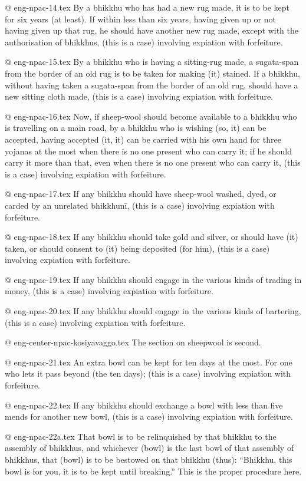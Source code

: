 @ eng-npac-14.tex
By a bhikkhu who has had a new rug made, it is to be kept for six years (at least). If within less than six years, having given up or not having given up that rug, he should have another new rug made, except with the authorisation of bhikkhus, (this is a case) involving expiation with forfeiture.

@ eng-npac-15.tex
By a bhikkhu who is having a sitting-rug made, a sugata-span from the border of an old rug is to be taken for making (it) stained. If a bhikkhu, without having taken a sugata-span from the border of an old rug, should have a new sitting cloth made, (this is a case) involving expiation with forfeiture.

@ eng-npac-16.tex
Now, if sheep-wool should become available to a bhikkhu who is travelling on a main road, by a bhikkhu who is wishing (so, it) can be accepted, having accepted (it, it) can be carried with his own hand for three yojanas at the most when there is no one present who can carry it; if he should carry it more than that, even when there is no one present who can carry it, (this is a case) involving expiation with forfeiture.

@ eng-npac-17.tex
If any bhikkhu should have sheep-wool washed, dyed, or carded by an unrelated bhikkhunī, (this is a case) involving expiation with forfeiture.

@ eng-npac-18.tex
If any bhikkhu should take gold and silver, or should have (it) taken, or should consent to (it) being deposited (for him), (this is a case) involving expiation with forfeiture.

@ eng-npac-19.tex
If any bhikkhu should engage in the various kinds of trading in money, (this is a case) involving expiation with forfeiture.

@ eng-npac-20.tex
If any bhikkhu should engage in the various kinds of bartering, (this is a case) involving expiation with forfeiture.

@ eng-center-npac-kosiyavaggo.tex
The section on sheepwool is second.

@ eng-npac-21.tex
An extra bowl can be kept for ten days at the most. For one who lets it pass beyond (the ten days); (this is a case) involving expiation with forfeiture.

@ eng-npac-22.tex
If any bhikkhu should exchange a bowl with less than five mends for another new bowl, (this is a case) involving expiation with forfeiture. 

@ eng-npac-22a.tex
That bowl is to be relinquished by that bhikkhu to the assembly of bhikkhus, and whichever (bowl) is the last bowl of that assembly of bhikkhus, that (bowl) is to be bestowed on that bhikkhu (thus): “Bhikkhu, this bowl is for you, it is to be kept until breaking.” This is the proper procedure here.


